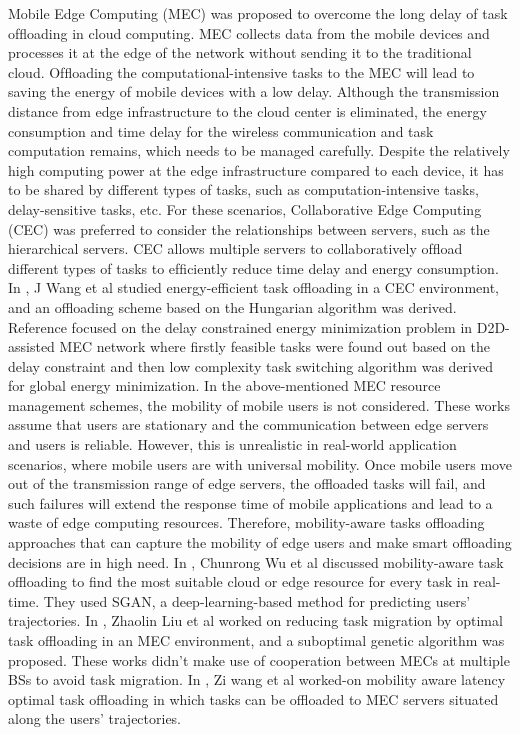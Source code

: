 \documentclass[conference]{IEEEtran}
\begin{document}
Mobile Edge Computing (MEC) was proposed to overcome the long delay of task ofﬂoading in cloud computing. MEC collects data from the mobile devices and processes it at the edge of the network without sending it to the traditional cloud. Ofﬂoading the computational-intensive tasks to the MEC will lead to saving the energy of mobile devices with a low delay. Although the transmission distance from edge infrastructure to the cloud center is eliminated, the energy consumption and time delay for the wireless communication and task computation remains, which needs to be managed carefully. 
	Despite the relatively high computing power at the edge infrastructure compared to each device, it has to be shared by different types of tasks, such as computation-intensive tasks, delay-sensitive tasks, etc. For these scenarios, Collaborative Edge Computing (CEC) was preferred to consider the relationships between servers, such as the hierarchical servers. CEC allows multiple servers to collaboratively ofﬂoad different types of tasks to efﬁciently reduce time delay and energy consumption. In \cite{b1}, J Wang et al studied energy-efficient task offloading in a CEC environment, and an offloading scheme based on the Hungarian algorithm was derived. Reference \cite{b2} focused on the delay constrained energy minimization problem in D2D-assisted MEC network where firstly feasible tasks were found out based on the delay constraint and then low complexity task switching algorithm was derived for global energy minimization.
	In the above-mentioned MEC resource management schemes, the mobility of mobile users is not considered. These works assume that users are stationary and the communication between edge servers and users is reliable. However, this is unrealistic in real-world application scenarios, where mobile users are with universal mobility. Once mobile users move out of the transmission range of edge servers, the offloaded tasks will fail, and such failures will extend the response time of mobile applications and lead to a waste of edge computing resources. Therefore, mobility-aware tasks offloading approaches that can capture the mobility of edge users and make smart offloading decisions are in high need. In \cite{b3}, Chunrong Wu et al discussed mobility-aware task offloading to find the most suitable cloud or edge resource for every task in real-time. They used SGAN, a deep-learning-based method for predicting users’ trajectories. In \cite{b4}, Zhaolin Liu et al worked on reducing task migration by optimal task offloading in an MEC environment, and a suboptimal genetic algorithm was proposed. These works didn’t make use of cooperation between MECs at multiple BSs to avoid task migration. In \cite{b5}, Zi wang et al worked-on mobility aware latency optimal task offloading in which tasks can be offloaded to MEC servers situated along the users’ trajectories. 
\end{document}
